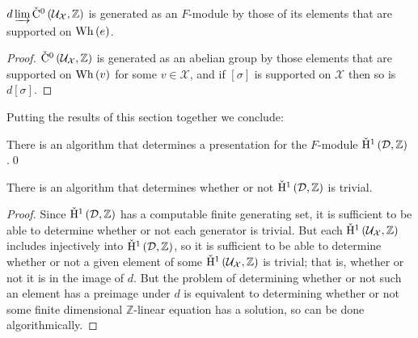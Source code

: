 \begin{lem}\label{lem:image} $d\varinjlim\check{\mathrm{C}}{}^0\left(\mathcal{U}_\mathcal{X},
\mathbb{Z} \right)$ is generated as an $F$-module by those of its elements
that are supported on $\mathrm{Wh}\left(e\right)$.\end{lem}

\begin{proof} $\check{\mathrm{C}}{}^0\left(\mathcal{U}_\mathcal{X}, \mathbb{Z} \right)$ is
generated as an abelian group by those elements that are supported on
$\mathrm{Wh}\left(v\right)$ for some $v \in \mathcal{X}$, and if $\left[\sigma\right]$ is
supported on $\mathcal{X}$ then so is $d\left[\sigma\right]$.\end{proof}

Putting the results of this section together we conclude:

\begin{thm} There is an algorithm that determines a presentation for the
$F$-module $\check{\mathrm{H}}{}^{1}\left(\mathcal{D}, \mathbb{Z}\right)$.\qed\end{thm}

\begin{cor} There is an algorithm that determines whether or not
$\check{\mathrm{H}}{}^{1}\left(\mathcal{D}, \mathbb{Z}\right)$ is trivial.\end{cor}

\begin{proof} Since $\check{\mathrm{H}}{}^{1}\left(\mathcal{D}, \mathbb{Z}\right)$ has a
computable finite generating set, it is sufficient to be able to determine
whether or not each generator is trivial. But each
$\check{\mathrm{H}}{}^{1}\left(\mathcal{U}_\mathcal{X}, \mathbb{Z}\right)$ includes
injectively into $\check{\mathrm{H}}{}^{1}\left(\mathcal{D}, \mathbb{Z}\right)$, so it is
sufficient to be able to determine whether or not a given element of some
$\check{\mathrm{H}}{}^1\left(\mathcal{U}_\mathcal{X}, \mathbb{Z}\right)$ is trivial; that
is, whether or not it is in the image of $d$. But the problem of determining
whether or not such an element has a preimage under $d$ is equivalent to
determining whether or not some finite dimensional $\mathbb{Z}$-linear
equation has a solution, so can be done algorithmically.  \end{proof}

